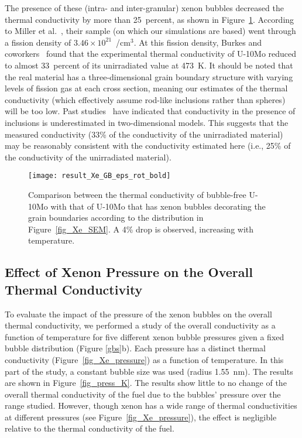 The presence of these (intra- and inter-granular) xenon bubbles decreased the thermal conductivity by more than 25~percent, as shown in Figure~\ref{fig_eff_K_GB}. According to Miller et al.~\cite{miller2012advantages},
their sample (on which our simulations are based) went through a fission density of $3.46\times10^{21}$~/cm$^{3}$. At this fission density, Burkes and coworkers~\cite{burkes2015thermal} found that the experimental thermal conductivity of U-10Mo reduced to almost 33~percent of its unirradiated value at 473~K\@. It should
be noted that the real material has a three-dimensional grain boundary structure with varying levels of fission gas at each cross section, meaning our estimates of the thermal conductivity (which effectively assume rod-like inclusions rather than spheres) will be too low. Past
studies~\cite{bakker1997using,Schulz1981} have indicated that
conductivity in the presence of inclusions is underestimated in two-dimensional
models. This suggests that the measured conductivity (33\% of the
conductivity of the unirradiated material) may be reasonably consistent with the conductivity estimated here (i.e., 25\% of the conductivity of the unirradiated material).

\begin{figure}
	\centering
	\texttt{[image: result\_Xe\_GB\_eps\_rot\_bold]}
    \caption[Comparison between the thermal conductivity of bubble-free U-10Mo
      with that of U-10Mo that has xenon bubbles decorating the grain
      boundaries according to the distribution in Figure~\ref{fig_Xe_SEM}.]{Comparison between the thermal conductivity of bubble-free U-10Mo
      with that of U-10Mo that has xenon bubbles decorating the grain
      boundaries according to the distribution in Figure~\ref{fig_Xe_SEM}. A
      4\% drop is observed, increasing with temperature.}
	\label{fig_eff_K_GB}
\end{figure}

\subsection{Effect of Xenon Pressure on the Overall Thermal Conductivity}
\label{subsec:xenonpressure}
To evaluate the impact of the pressure of the xenon bubbles on the overall thermal conductivity, we performed a study of the overall conductivity as a function of temperature for five different xenon bubble pressures given a fixed bubble distribution (Figure \ref{gbs}b). Each pressure has a distinct thermal conductivity (Figure~\ref{fig_Xe_pressure}) as a function of temperature. In this part of the study, a constant bubble size was used (radius 1.55~nm). The results are shown in Figure~\ref{fig_press_K}. The results show little to no change of the overall thermal conductivity of the fuel due to the bubbles' pressure over the range studied. However, though xenon has a wide range of thermal conductivities at different pressures (see Figure~\ref{fig_Xe_pressure}), the effect is negligible relative to the thermal conductivity of the fuel. 

